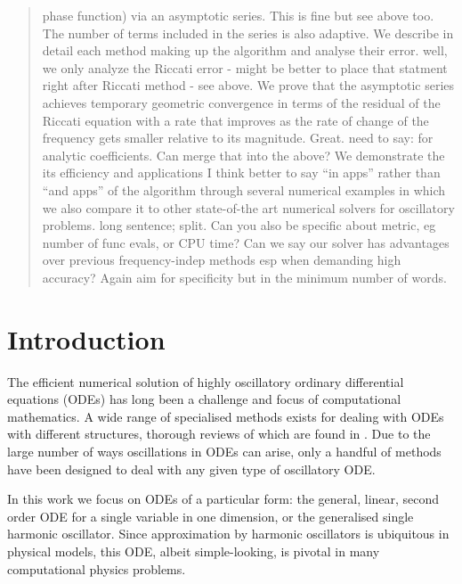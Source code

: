 \documentclass[10pt]{article}
\newcommand{\AB}[1]{{\color{orange}#1}}
\begin{document}
\begin{abstract}
phase function) via an asymptotic series. %
\AB{This is fine but see above too.}
The number of terms included
in the series is also adaptive.
We describe in detail each method making up the algorithm and analyse their
error.
\AB{well, we only analyze the Riccati error - might be better to place that statment right after Riccati method - see above.}
We prove that the asymptotic series achieves temporary
geometric convergence in terms of the residual of the Riccati equation with a
rate that improves as the rate of change of the frequency gets smaller
relative to its magnitude.
\AB{Great. need to say: for analytic coefficients. Can merge that into the above?}
We demonstrate the \AB{its} efficiency and applications
\AB{I think better to say ``in apps'' rather than ``and apps''}
of
the algorithm through several numerical examples in which we also compare
it to other state-of-the art numerical solvers for oscillatory problems.
\AB{long sentence; split. Can you also be specific about metric, eg number of func evals, or CPU time?}
\AB{Can we say our solver has advantages over previous frequency-indep
  methods esp when demanding high accuracy? Again aim for specificity but in the minimum number of words.}
\end{abstract}

 

\section{Introduction}

The efficient numerical solution of highly oscillatory ordinary differential
equations (ODEs) has long been a challenge and focus of computational
mathematics. A wide range of specialised methods exists for dealing with ODEs
with different structures, thorough reviews of which are found in
\cite{petzold1997,engquist2009}. Due to the large number of ways oscillations
in ODEs can arise, only a handful of methods have been designed to deal with any
given type of oscillatory ODE.  

In this work we focus on ODEs of a particular form: the general, linear, second
order ODE for a single variable in one dimension, or the generalised single harmonic oscillator.
Since approximation by harmonic oscillators is ubiquitous in physical models,
this ODE, albeit simple-looking, is pivotal in many computational physics problems.
\end{document}
